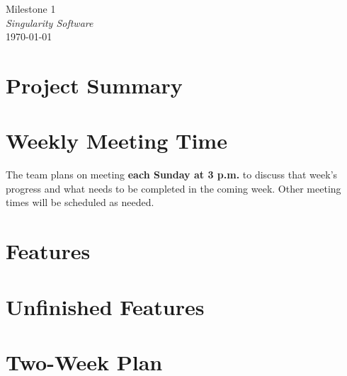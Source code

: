 \documentclass[12pt]{article}
\begin{document}
\begin{center}
	\LARGE{Milestone 1} \\
	\Large{\textit{Singularity Software}} \\
	\vspace{.05in}
	\normalsize{\today} \\
\end{center}

\section*{Project Summary}


\section*{Weekly Meeting Time}
The team plans on meeting \textbf{each Sunday at 3 p.m.} to discuss that week's progress and what needs to be completed in the coming week. Other meeting times will be scheduled as needed.

\section*{Features}


\section*{Unfinished Features}


\section*{Two-Week Plan}

        
\end{document}
